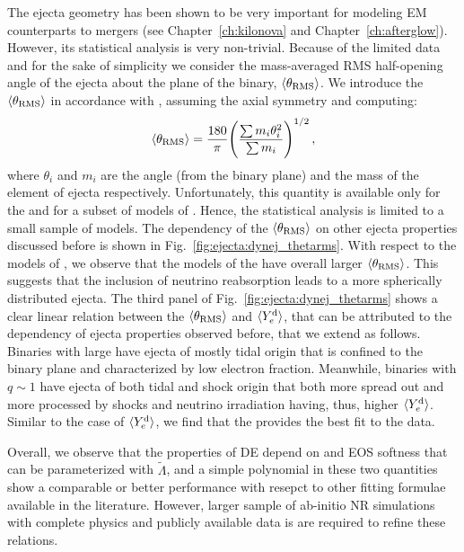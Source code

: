 %
The ejecta geometry has been shown to be very important for modeling \ac{EM} 
counterparts to mergers (see Chapter~\ref{ch:kilonova} and Chapter~\ref{ch:afterglow}). %
However, its statistical analysis is very non-trivial. 
Because of the limited data and for the sake of simplicity 
we consider the mass-averaged \ac{RMS} half-opening 
angle of the ejecta about the plane of the binary, $\langle\theta_{\rm RMS}\rangle$.
We introduce the $\langle\theta_{\rm RMS}\rangle$ in accordance with \citet{Radice:2018pdn}, assuming 
the axial symmetry and computing:
%
\begin{equation}
\langle\theta_{\rm RMS}\rangle = \frac{180}{\pi}\Bigg(\frac{\sum m_i \theta_i^2}{\sum m_i}\Bigg)^{1/2}\, ,
\end{equation}
%
where $\theta_i$ and $m_i$ are the angle (from the binary plane) and the mass of 
the element of ejecta respectively.
%
Unfortunately, this quantity is available only for the \DSrefset{} and for a subset 
of models of \citet{Radice:2018pdn}. 
Hence, the statistical analysis is limited 
to a small sample of models. The dependency of the $\langle\theta_{\rm RMS}\rangle$ on other ejecta 
properties discussed before is shown in Fig.~\ref{fig:ejecta:dynej_thetarms}.
%
With respect to the models of \citet{Radice:2018pdn}, we observe that the models of the 
\DSrefset{} have overall larger $\langle\theta_{\rm RMS}\rangle$. This suggests that the inclusion of 
neutrino reabsorption leads to a more spherically distributed ejecta.
%
The third panel of Fig.~\ref{fig:ejecta:dynej_thetarms} shows a clear linear relation 
between the $\langle\theta_{\rm RMS}\rangle$ and $\langle Y^{\text{d}}_{e}\rangle$, that can be attributed to the \mr{} dependency of 
ejecta properties observed before, that we extend as follows. 
Binaries with large \mr{} have ejecta of mostly tidal origin that 
is confined to the binary plane and characterized by low electron fraction. 
Meanwhile, binaries with $q\sim 1$ have ejecta of both tidal and shock origin that both 
more spread out and more processed by shocks and neutrino irradiation having, thus,
higher $\langle Y^{\text{d}}_{e}\rangle$. 
%
Similar to the case of $\langle Y^{\text{d}}_{e}\rangle$, we find that the \polql{} provides the best fit to the data.

Overall, we observe that the properties of \ac{DE} depend on \mr{} and 
\ac{EOS} softness that can be parameterized with $\tilde{\Lambda}$, and a simple 
polynomial in these two quantities show a comparable or better performance with 
resepct to other fitting formulae available in the literature. 
%
However, larger sample of ab-initio \ac{NR} simulations with complete physics and 
publicly available data is are required to refine these relations.

